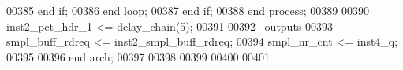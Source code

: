 \begin{DoxyCode}
00385          \textcolor{keywordflow}{end} \textcolor{keywordflow}{if};
00386       \textcolor{keywordflow}{end} \textcolor{keywordflow}{loop};
00387    \textcolor{keywordflow}{end} \textcolor{keywordflow}{if};
00388 \textcolor{keywordflow}{end} \textcolor{keywordflow}{process};
00389         
00390  inst2\_pct\_hdr\_1 <=  delay\_chain(\textcolor{vhdllogic}{5}); 
00391 
00392 \textcolor{keyword}{--outputs}
00393 \textcolor{vhdlchar}{smpl_buff_rdreq} \textcolor{vhdlchar}{<=} \textcolor{vhdlchar}{inst2_smpl_buff_rdreq};
00394 \textcolor{vhdlchar}{smpl_nr_cnt} \textcolor{vhdlchar}{<=} \textcolor{vhdlchar}{inst4_q};
00395   
00396 \textcolor{keywordflow}{end} \textcolor{vhdlchar}{arch};   
00397 
00398 
00399 
00400 
00401 
\end{DoxyCode}
